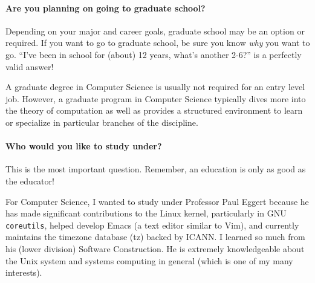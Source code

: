 \documentclass[12pt]{article}
\newenvironment{example}{
\begin{tcolorbox}[title=Example, colback=blue!5!white, colframe=black!75!blue]
}{ \end{tcolorbox} }
\renewcommand{\it}[1]{\textit{{#1}}}
\begin{document}
\paragraph{Are you planning on going to graduate school?} Depending on your
major and career goals, graduate school may be an option or required. If you
want to go to graduate school, be sure you know \it{why} you want to go. ``I've
been in school for (about) 12 years, what's another 2-6?'' is a perfectly valid answer!
\begin{example}
    A graduate degree in Computer Science is usually not required for an entry
    level job. However, a graduate program in Computer Science typically dives
    more into the theory of computation as well as provides a structured
    environment to learn or specialize in particular branches of the discipline.
\end{example}

\paragraph{Who would you like to study under?} This
is the most important question. Remember, an education is only as good as the
educator!
\begin{example}
    For Computer Science, I wanted to study under Professor Paul Eggert because
    he has made significant contributions to the Linux kernel, particularly in
    GNU \texttt{coreutils}, helped develop Emacs (a text editor similar to
    Vim), and currently maintains the timezone database (tz) backed by ICANN.
    I learned so much from his (lower division) Software Construction. He is
    extremely knowledgeable about the Unix system and systems computing in
    general (which is one of my many interests).
\end{example}
\end{document}
